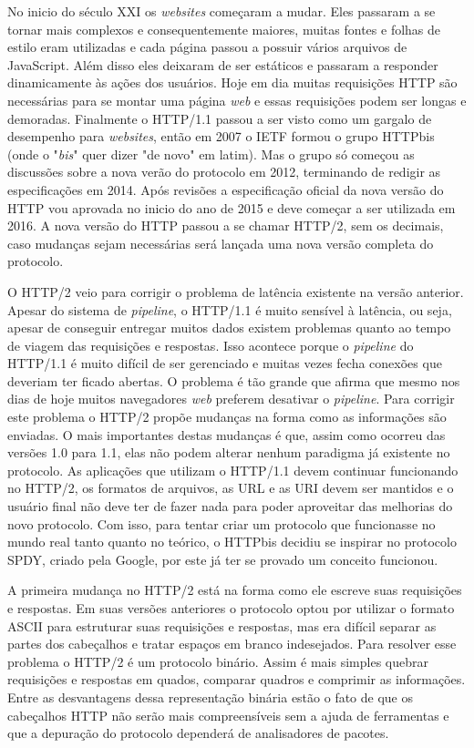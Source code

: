 No inicio do século XXI os \textit{websites} começaram a mudar. Eles passaram a se tornar mais complexos e consequentemente maiores, muitas fontes e folhas de estilo eram utilizadas e cada página passou a possuir vários arquivos de JavaScript. Além disso eles deixaram de ser estáticos e passaram a responder dinamicamente às ações dos usuários. Hoje em dia muitas requisições HTTP são necessárias para se montar uma página \textit{web} e essas requisições podem ser longas e demoradas. Finalmente o HTTP/1.1 passou a ser visto como um gargalo de desempenho para \textit{websites}, então em 2007 o IETF formou o grupo HTTPbis (onde o "\textit{bis}" quer dizer "de novo" em latim). Mas o grupo só começou as discussões sobre a nova verão do protocolo em 2012, terminando de redigir as especificações em 2014. Após revisões a especificação oficial da nova versão do HTTP vou aprovada no inicio do ano de 2015 e deve começar a ser utilizada em 2016. A nova versão do HTTP passou a se chamar  HTTP/2, sem os decimais, caso mudanças sejam necessárias será lançada uma nova versão completa do protocolo. 

O HTTP/2 veio para corrigir o problema de latência existente na versão anterior. Apesar do sistema de \textit{pipeline}, o HTTP/1.1 é muito sensível à latência, ou seja, apesar de conseguir entregar muitos dados existem problemas quanto ao tempo de viagem das requisições e respostas. Isso acontece porque o \textit{pipeline} do HTTP/1.1 é muito difícil de ser gerenciado e muitas vezes fecha conexões que deveriam ter ficado abertas. O problema é tão grande que \cite{HTTP2Explained} afirma que  mesmo nos dias de hoje muitos navegadores \textit{web} preferem desativar o \textit{pipeline}. Para corrigir este problema o HTTP/2 propõe mudanças na forma como as informações são enviadas. O mais importantes destas mudanças é que, assim como ocorreu das versões 1.0 para 1.1, elas não podem alterar nenhum paradigma já existente no protocolo. As aplicações que utilizam o HTTP/1.1 devem continuar funcionando no HTTP/2, os formatos de arquivos, as URL e as URI devem ser mantidos e o usuário final não deve ter de fazer nada para poder aproveitar das melhorias do novo protocolo. Com isso, para tentar criar um protocolo que funcionasse no mundo real tanto quanto no teórico, o HTTPbis decidiu se inspirar no protocolo SPDY, criado pela Google, por este já ter se provado um conceito funcionou.

A primeira mudança no HTTP/2 está na forma como ele escreve suas requisições e respostas. Em suas versões anteriores o protocolo optou por utilizar o formato ASCII para estruturar suas requisições e respostas, mas era difícil separar as partes dos cabeçalhos e tratar espaços em branco indesejados. Para resolver esse problema o HTTP/2 é um protocolo binário. Assim é mais simples quebrar requisições e respostas em quados, comparar quadros e comprimir as informações. Entre as desvantagens dessa representação binária estão o fato de que os cabeçalhos HTTP não serão mais compreensíveis sem a ajuda de ferramentas e que a depuração do protocolo dependerá de analisadores de pacotes.

